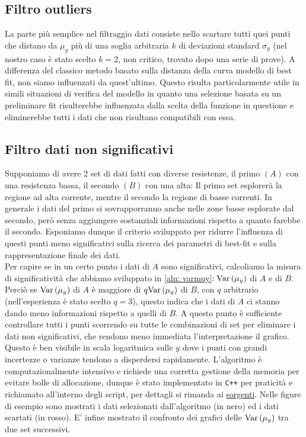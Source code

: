 \documentclass{article}[a4paper, oneside, 11pt]
\begin{document}
\subsection{Filtro outliers}
La parte più semplice nel filtraggio dati consiste nello scartare tutti quei
punti che distano da $\mu_y$ più di una soglia arbitraria $k$ di deviazioni
standard $\sigma_y$ (nel nostro caso è stato scelto $k = 2$, non critico,
trovato dopo una serie di prove). A differenza del classico metodo basato
sulla distanza della curva modello di best fit, non siamo influenzati da
quest’ultimo. Questo risulta particolarmente utile in simili situazioni di
verifica del modello in quanto una selezione basata su un preliminare fit
risulterebbe influenzata dalla scelta della funzione in questione e
eliminerebbe tutti i dati che non risultano compatibili con essa.

\subsection{Filtro dati non significativi}
Supponiamo di avere 2 set di dati fatti con diverse resistenze, il primo $(A)$
con una resistenza bassa, il secondo $(B)$ con una alta: Il primo set esplorerà
la regione ad alta corrente, mentre il secondo la regione di basse correnti.
In generale i dati del primo si sovrapporranno anche nelle zone basse esplorate
dal secondo, però senza aggiungere sostanziali informazioni rispetto a quanto
farebbe il secondo.
Esponiamo dunque il criterio sviluppato per ridurre l'influenza di questi
punti meno significativi sulla ricerca dei parametri di best-fit e sulla
rappresentazione finale dei dati.\\
Per capire se in un certo punto i dati di $A$ sono significativi, calcoliamo
la misura di significatività che abbiamo sviluppato in \eqref{aln: varmuy}$:
\text{Var}\left(\mu_y\right)$ di $A$ e di $B$. Perciò se $\text{Var}\left(\mu_y\right)$ di $A$ è maggiore di 
$q\text{Var}\left(\mu_y\right)$ di $B$, con $q$ arbitrario (nell’esperienza è stato scelto
$q = 3$), questo indica che i dati di $A$
ci stanno dando meno informazioni rispetto a quelli di $B$. A questo punto
è sufficiente controllare tutti i punti scorrendo su tutte le combinazioni
di set per eliminare i dati non significativi, che rendono meno
immediata l'interpretazione il grafico. Questo è ben visibile in scala
logaritmica sulle $y$ dove i punti con grandi incertezze o varianze tendono
a disperdersi rapidamente.
L’algoritmo è computazionalmente intensivo e richiede una corretta gestione
della memoria per evitare bolle di allocazione, dunque è stato implementato
in \verb'C++' per praticità e richiamato all’interno degli script, per dettagli si 
rimanda ai 
\href{https://github.com/LucaCiucci/relaz_seme/tree/master/Cartella_fit/filter_src}{sorgenti}.
Nelle figure di esempio sono mostrati i dati selezionati dall’algoritmo
(in nero) ed i dati scartati (in rosso). 
E’ infine mostrato il confronto dei grafici delle $\text{Var}\left(\mu_y\right)$
tra due set successivi.
\end{document}

